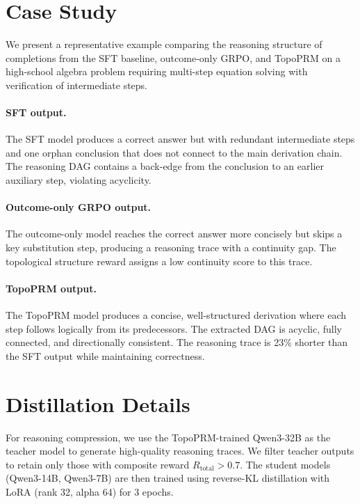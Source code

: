 \section{Case Study}
\label{app:case_study}

We present a representative example comparing the reasoning structure
of completions from the SFT baseline, outcome-only GRPO, and TopoPRM
on a high-school algebra problem requiring multi-step equation solving
with verification of intermediate steps.

\paragraph{SFT output.}
The SFT model produces a correct answer but with redundant intermediate
steps and one orphan conclusion that does not connect to the main
derivation chain. The reasoning DAG contains a back-edge from the
conclusion to an earlier auxiliary step, violating acyclicity.

\paragraph{Outcome-only GRPO output.}
The outcome-only model reaches the correct answer more concisely but
skips a key substitution step, producing a reasoning trace with a
continuity gap. The topological structure reward assigns a low continuity
score to this trace.

\paragraph{TopoPRM output.}
The TopoPRM model produces a concise, well-structured derivation where
each step follows logically from its predecessors. The extracted DAG is
acyclic, fully connected, and directionally consistent. The reasoning
trace is 23\% shorter than the SFT output while maintaining correctness.

\section{Distillation Details}
\label{app:distill}

For reasoning compression, we use the TopoPRM-trained Qwen3-32B as the
teacher model to generate high-quality reasoning traces. We filter
teacher outputs to retain only those with composite reward
$R_\mathrm{total} > 0.7$. The student models (Qwen3-14B, Qwen3-7B) are
then trained using reverse-KL distillation with LoRA (rank 32, alpha 64)
for 3 epochs.

